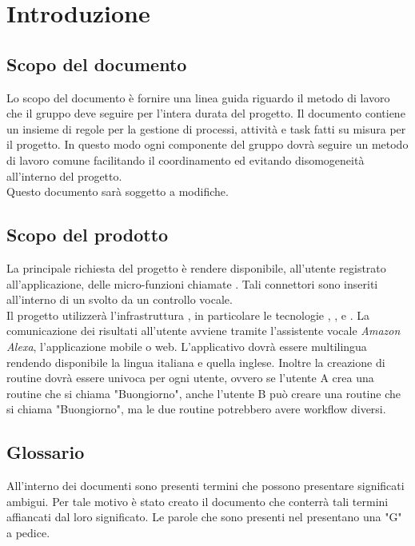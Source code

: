 \justify \section{Introduzione}

\subsection{Scopo del documento}
Lo scopo del documento è fornire una linea guida riguardo il metodo di lavoro che il gruppo deve seguire per l'intera durata del progetto.
Il documento contiene un insieme di regole per la gestione di processi, attività e task fatti su misura per il
progetto. In questo modo ogni componente del gruppo dovrà seguire un metodo di lavoro comune
facilitando il coordinamento ed evitando disomogeneità all'interno del
progetto.\\ 
Questo documento sarà soggetto a modifiche.

\subsection{Scopo del prodotto}
La principale richiesta del progetto è rendere disponibile, all'utente registrato all'applicazione, delle micro-funzioni chiamate .
Tali connettori sono inseriti all'interno di un  svolto da un controllo vocale. \\
Il progetto utilizzerà l'infrastruttura , in particolare le tecnologie , ,  e . La comunicazione dei risultati all'utente avviene tramite l'assistente vocale \textit{Amazon Alexa\glo}, l'applicazione mobile o web.
L'applicativo dovrà essere multilingua rendendo disponibile la lingua italiana e quella inglese.
Inoltre la creazione di routine dovrà essere univoca per ogni utente, ovvero se l'utente A crea una routine che si chiama "Buongiorno", anche
l'utente B può creare una routine che si chiama "Buongiorno", ma le due routine potrebbero avere workflow diversi.

\subsection{Glossario}
All'interno dei documenti sono presenti termini che possono presentare significati ambigui. 
Per tale motivo è stato creato il documento  \docNameVersionGlo{} che conterrà tali termini 
affiancati dal loro significato. Le parole che sono presenti nel \docNameVersionGlo{} 
presentano una "G" a pedice.  

